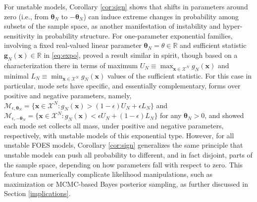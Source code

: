 \documentclass[numbib]{imamat}
\theoremstyle{theorem}
\theoremstyle{lemma}
\theoremstyle{example}
\theoremstyle{corollary}
\theoremstyle{definition}
\theoremstyle{remark}
\theoremstyle{approximation}
\theoremstyle{scheme}
\begin{document}
For unstable models, Corollary \ref{cor:sign} shows that shifts in
parameters around zero (i.e., from \(\boldsymbol \theta_N\) to
\(-\boldsymbol \theta_N\)) can induce extreme changes in probability
among subsets of the sample space, as another manifestation of
instability and hyper-sensitivity in probability structure. For
one-parameter exponential families, involving a fixed real-valued linear
parameter \(\boldsymbol \theta_N = \theta \in \mathbb{R}\) and
sufficient statistic \(\boldsymbol g_N(\boldsymbol x)\in \mathbb{R}\) in
\eqref{eq:expo}, \citet[Theorem 3]{schweinberger2011instability} proved a
result similar in spirit, though based on a characterization there in
terms of maximum
\(U_N \equiv \max_{\boldsymbol x\in\mathcal{X}^N}g_N(\boldsymbol x)\)
and minimal
\(L_N \equiv \min_{\boldsymbol x\in\mathcal{X}^N}g_N(\boldsymbol x)\)
values of the sufficient statistic. For this case in particular, mode
sets have specific, and essentially complementary, forms over positive
and negative parameters, namely,
\(\mathcal{M}_{\epsilon, \boldsymbol \theta_N} = \{\boldsymbol x \in\mathcal{X}^N: g_N(\boldsymbol x) > (1-\epsilon) U_N + \epsilon L_N \}\)
and
\(\mathcal{M}_{\epsilon, -\boldsymbol \theta_N} = \{\boldsymbol x \in\mathcal{X}^N: g_N(\boldsymbol x) < \epsilon U_N + (1-\epsilon) L_N \}\)
for any \(\boldsymbol \theta_N>0\), and \citet[Theorem
3]{schweinberger2011instability} showed each mode set collects all mass,
under positive and negative parameters, respectively, with unstable
models of this exponential type. However, for all unstable FOES models,
Corollary \ref{cor:sign} generalizes the same principle that unstable
models can push all probability to different, and in fact disjoint,
parts of the sample space, depending on how parameters fall with respect
to zero. This feature can numerically complicate likelihood
manipulations, such as maximization or MCMC-based Bayes posterior
sampling, as further discussed in Section \ref{implications}.
\end{document}
